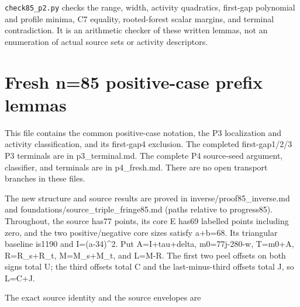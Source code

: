 \documentclass[10pt,a4paper]{article}
\theoremstyle{definition}
\begin{document}
\texttt{check85\_\allowbreak{}\allowbreak{}p2.py} checks the range,\allowbreak{} width,\allowbreak{}
activity quadratics,\allowbreak{} first-gap polynomial and profile minima,\allowbreak{} C7
equality,\allowbreak{} rooted-forest scalar margins,\allowbreak{} and terminal contradiction. It
is an arithmetic checker of these written lemmas,\allowbreak{} not an enumeration of
actual source sets or activity descriptors.

\clearpage
\hypertarget{fresh-n85-positive-case-prefix-lemmas}{%
\section{Fresh n=\allowbreak{}85 positive-case prefix
lemmas}\label{fresh-n85-positive-case-prefix-lemmas}}

This file contains the common positive-case notation,\allowbreak{} the P3
localization and activity classification,\allowbreak{} and its first-gap4 exclusion.
The completed first-gap1/2/3 P3 terminals are in p3\_\allowbreak{}terminal.md. The
complete P4 source-seed argument,\allowbreak{} classifier,\allowbreak{} and terminals are in
p4\_\allowbreak{}fresh.md. There are no open transport branches in these files.

The new structure and source results are proved in
inverse/proof85\_\allowbreak{}inverse.md and foundations/source\_\allowbreak{}triple\_\allowbreak{}fringe85.md
(paths relative to progress85). Throughout,\allowbreak{} the source has77 points,\allowbreak{} its
core E has69 labelled points including zero,\allowbreak{} and the two
positive/negative core sizes satisfy a+\allowbreak{}b=\allowbreak{}68. Its triangular baseline
is1190 and I=\allowbreak{}(a-34)\^{}2. Put A=\allowbreak{}I+\allowbreak{}tau+\allowbreak{}delta,\allowbreak{} m0=\allowbreak{}77j-280-w,\allowbreak{} T=\allowbreak{}m0+\allowbreak{}A,\allowbreak{}
R=\allowbreak{}R\_\allowbreak{}s+\allowbreak{}R\_\allowbreak{}t,\allowbreak{} M=\allowbreak{}M\_\allowbreak{}s+\allowbreak{}M\_\allowbreak{}t,\allowbreak{} and L=\allowbreak{}M-R. The first two peel offsets on both
signs total U; the third offsets total C and the last-minus-third
offsets total J,\allowbreak{} so L=\allowbreak{}C+\allowbreak{}J.

The exact source identity and the source envelopes are
\end{document}
